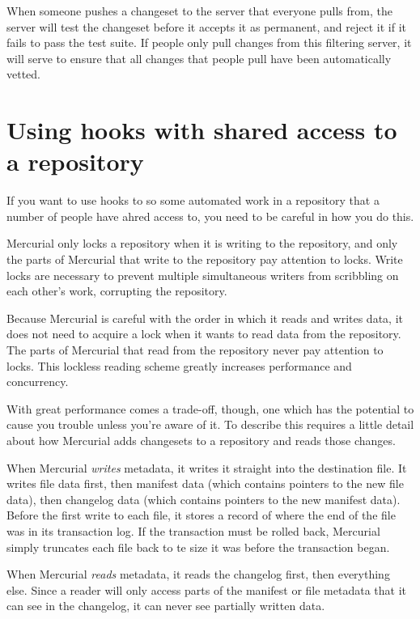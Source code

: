 When someone pushes a changeset to the server that everyone pulls
from, the server will test the changeset before it accepts it as
permanent, and reject it if it fails to pass the test suite.  If
people only pull changes from this filtering server, it will serve to
ensure that all changes that people pull have been automatically
vetted.

\section{Using hooks with shared access to a repository}

If you want to use hooks to so some automated work in a repository
that a number of people have ahred access to, you need to be careful
in how you do this.

Mercurial only locks a repository when it is writing to the
repository, and only the parts of Mercurial that write to the
repository pay attention to locks.  Write locks are necessary to
prevent multiple simultaneous writers from scribbling on each other's
work, corrupting the repository.

Because Mercurial is careful with the order in which it reads and
writes data, it does not need to acquire a lock when it wants to read
data from the repository.  The parts of Mercurial that read from the
repository never pay attention to locks.  This lockless reading scheme
greatly increases performance and concurrency.

With great performance comes a trade-off, though, one which has the
potential to cause you trouble unless you're aware of it.  To describe
this requires a little detail about how Mercurial adds changesets to a
repository and reads those changes.

When Mercurial \emph{writes} metadata, it writes it straight into the
destination file.  It writes file data first, then manifest data
(which contains pointers to the new file data), then changelog data
(which contains pointers to the new manifest data).  Before the first
write to each file, it stores a record of where the end of the file
was in its transaction log.  If the transaction must be rolled back,
Mercurial simply truncates each file back to te size it was before the
transaction began.

When Mercurial \emph{reads} metadata, it reads the changelog first,
then everything else.  Since a reader will only access parts of the
manifest or file metadata that it can see in the changelog, it can
never see partially written data.

